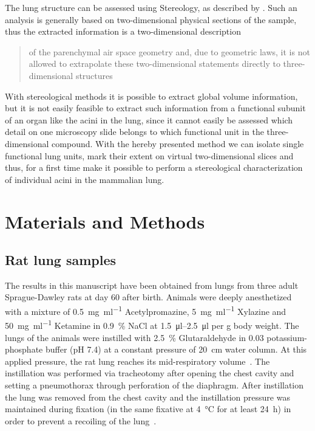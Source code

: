 \documentclass[twoside,paper=a4,abstract=true,english,DIV=calc]{scrartcl}
\begin{document}
The lung structure can be assessed using Stereology, as described by \citet{Hsia2010}.
Such an analysis is generally based on two-dimensional physical sections of the sample, thus the extracted information is a two-dimensional description \blockquote[\citet{Tschanz2002}]{of the parenchymal air space geometry and, due to geometric laws, it is not allowed to extrapolate these two-dimensional statements directly to three-dimensional structures}.
With stereological methods it is possible to extract global volume information, but it is not easily feasible to extract such information from a functional subunit of an organ like the acini in the lung, since it cannot easily be assessed which detail on one microscopy slide belongs to which functional unit in the three-dimensional compound.
With the hereby presented method we can isolate single functional lung units, mark their extent on virtual two-dimensional slices and thus, for a first time make it possible to perform a stereological characterization of individual acini in the mammalian lung.

\section{Materials and Methods\label{sec:materials and methods}}
\subsection{Rat lung samples}
The results in this manuscript have been obtained from lungs from three adult Sprague-Dawley rats at day 60 after birth.
Animals were deeply anesthetized with a mixture of %
\SI{0.5}{\milli\gram\per\milli\litre} Acetylpromazine, %
\SI{5}{\milli\gram\per\milli\litre} Xylazine and %
\SI{50}{\milli\gram\per\milli\litre} Ketamine in %
\SI{0.9}{\percent} NaCl at \SIrange{1.5}{2.5}{\micro\litre} per \si{\gram} body weight.
The lungs of the animals were instilled with \SI{2.5}{\percent} Glutaraldehyde in \SI{0.03}{\Molar} potassium-phosphate buffer (pH 7.4) at a constant pressure of \SI{20}{\centi\meter} water column.
At this applied pressure, the rat lung reaches its mid-respiratory volume~\cite{Schittny1998}.
The instillation was performed via tracheotomy after opening the chest cavity and setting a pneumothorax through perforation of the diaphragm.
After instillation the lung was removed from the chest cavity and the instillation pressure was maintained during fixation (in the same fixative at \SI{4}{\celsius} for at least \SI{24}{\hour}) in order to prevent a recoiling of the lung~\cite{Tschanz2002}.
\end{document}
